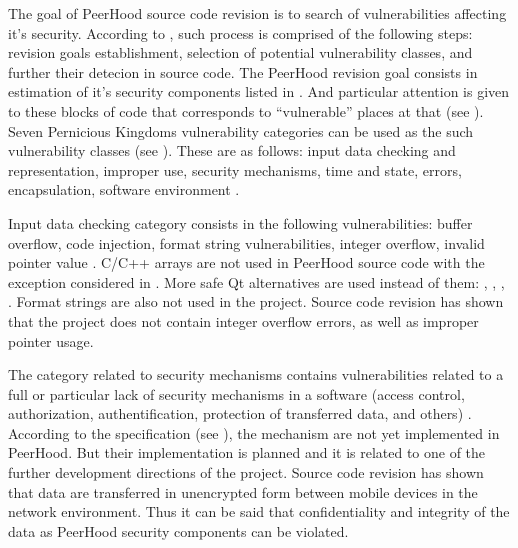 

The goal of PeerHood source code revision is to search of vulnerabilities affecting it's security. 
%
According to  , such process is comprised of the following steps: revision goals establishment, selection of potential vulnerability classes, and further their detecion in source code. 
%
The PeerHood revision goal consists in estimation of it's security components listed in . 
%
And particular attention is given to these blocks of code that corresponds to ``vulnerable'' places at that (see ). 
%
Seven Pernicious Kingdoms vulnerability categories can be used as the such vulnerability classes (see ). 
%
These are as follows: input data checking and representation, improper  use, security mechanisms, time and state, errors, encapsulation, software environment . 

%
Input data checking category consists in the following vulnerabilities: buffer overflow, code injection, format string vulnerabilities, integer overflow, invalid pointer value . 
%
C/C++ arrays are not used in PeerHood source code with the exception considered in . 
%
More safe Qt alternatives are used instead of them: , , ,  . 
%
Format strings are also not used in the project. 
%
Source code revision has shown that the project does not contain integer overflow errors, as well as improper pointer usage. 

%
The category related to security mechanisms contains vulnerabilities related to a full or particular lack of security mechanisms in a software (access control, authorization, authentification, protection of transferred data, and others) . 
%
According to the specification (see ), the mechanism are not yet implemented in PeerHood. 
%
But their implementation is planned and it is related to one of the further development directions of the project. 
%
Source code revision has shown that data are transferred in unencrypted form between mobile devices in the network environment. 
%
Thus it can be said that confidentiality and integrity of the data as PeerHood security components can be violated. 

